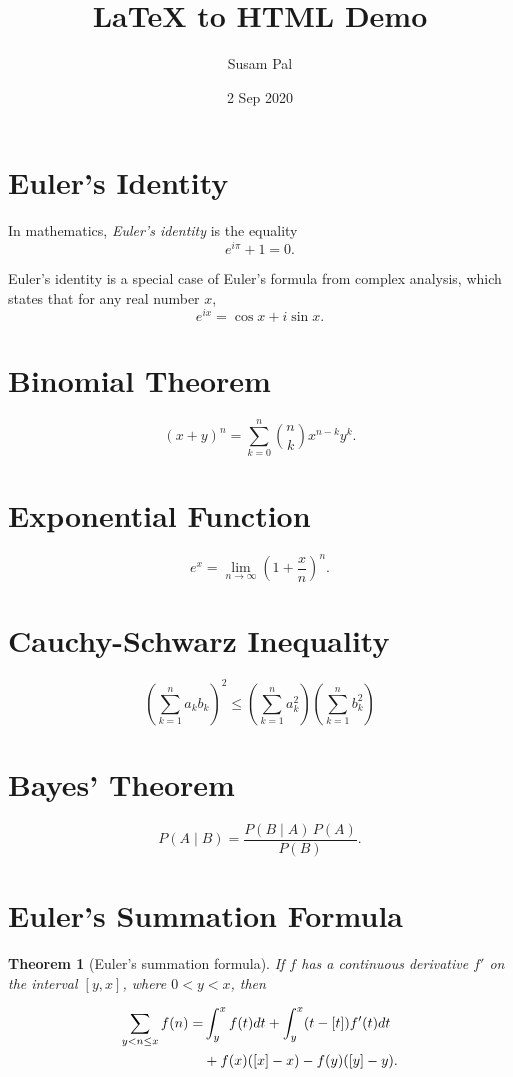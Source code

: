 \documentclass{article}
\title{\LaTeX{} to HTML Demo}
\author{Susam Pal}
\date{\normalsize 2 Sep 2020}
\newtheorem{theorem}{Theorem}
\begin{document}
\maketitle

\section{Euler's Identity}
In mathematics, \emph{Euler's identity} is the equality \[ e^{i \pi} + 1
= 0. \]

Euler's identity is a special case of Euler's formula from complex
analysis, which states that for any real number \( x \),
\[ e^{ix} = \cos x + i \sin x. \]

\section{Binomial Theorem}
\[ (x+y)^n = \sum_{k=0}^n {n \choose k} x^{n - k} y^k. \]

\section{Exponential Function}
\[ e^x = \lim_{n \to \infty} \left( 1+ \frac{x}{n} \right)^n. \]


\section{Cauchy-Schwarz Inequality}
\[
    \left( \sum_{k=1}^n a_k b_k \right)^2 \leq
    \left( \sum_{k=1}^n a_k^2 \right)
    \left( \sum_{k=1}^n b_k^2 \right)
\]


\section{Bayes' Theorem}
\[ P(A \mid B) = \frac{P(B \mid A) \, P(A)}{P(B)}. \]


\section{Euler's Summation Formula}

\begin{theorem}[Euler's summation formula]
If \( f \) has a continuous derivative \( f' \) on the interval \( [y,
x] \), where \( 0 < y < x \), then

\begin{align}
\sum_{y < n \le x} f(n) = & \int_y^x f(t) dt +
                            \int_y^x (t - [t]) f'(t) dt \notag \\
                          & + f(x)([x] - x) - f(y)([y] - y).
\label{theorem}
\end{align}

\end{theorem}
\end{document}
